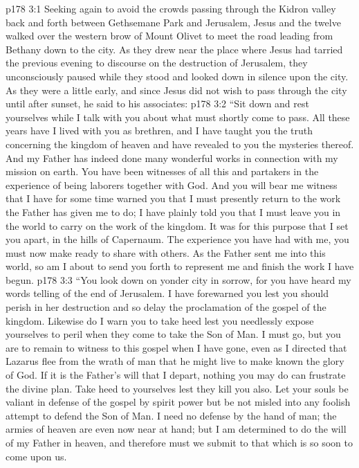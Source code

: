 \vs p178 3:1 Seeking again to avoid the crowds passing through the Kidron valley back and forth between Gethsemane Park and Jerusalem, Jesus and the twelve walked over the western brow of Mount Olivet to meet the road leading from Bethany down to the city. As they drew near the place where Jesus had tarried the previous evening to discourse on the destruction of Jerusalem, they unconsciously paused while they stood and looked down in silence upon the city. As they were a little early, and since Jesus did not wish to pass through the city until after sunset, he said to his associates:
\vs p178 3:2 \pc \textcolor{ubdarkred}{“Sit down and rest yourselves while I talk with you about what must shortly come to pass. All these years have I lived with you as brethren, and I have taught you the truth concerning the kingdom of heaven and have revealed to you the mysteries thereof. And my Father has indeed done many wonderful works in connection with my mission on earth. You have been witnesses of all this and partakers in the experience of being laborers together with God. And you will bear me witness that I have for some time warned you that I must presently return to the work the Father has given me to do; I have plainly told you that I must leave you in the world to carry on the work of the kingdom. It was for this purpose that I set you apart, in the hills of Capernaum. The experience you have had with me, you must now make ready to share with others. As the Father sent me into this world, so am I about to send you forth to represent me and finish the work I have begun.}
\vs p178 3:3 \textcolor{ubdarkred}{“You look down on yonder city in sorrow, for you have heard my words telling of the end of Jerusalem. I have forewarned you lest you should perish in her destruction and so delay the proclamation of the gospel of the kingdom. Likewise do I warn you to take heed lest you needlessly expose yourselves to peril when they come to take the Son of Man. I must go, but you are to remain to witness to this gospel when I have gone, even as I directed that Lazarus flee from the wrath of man that he might live to make known the glory of God. If it is the Father’s will that I depart, nothing you may do can frustrate the divine plan. Take heed to yourselves lest they kill you also. Let your souls be valiant in defense of the gospel by spirit power but be not misled into any foolish attempt to defend the Son of Man. I need no defense by the hand of man; the armies of heaven are even now near at hand; but I am determined to do the will of my Father in heaven, and therefore must we submit to that which is so soon to come upon us.}
